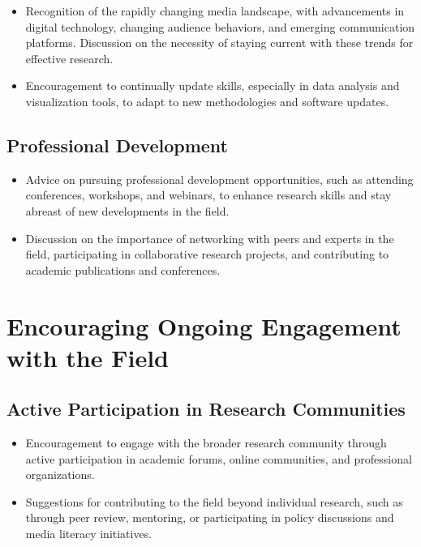\documentclass[
]{book}
\begin{document}
\begin{itemize}
\item
  Recognition of the rapidly changing media landscape, with advancements in digital technology, changing audience behaviors, and emerging communication platforms. Discussion on the necessity of staying current with these trends for effective research.
\item
  Encouragement to continually update skills, especially in data analysis and visualization tools, to adapt to new methodologies and software updates.
\end{itemize}

\hypertarget{professional-development}{%
\subsection*{Professional Development}\label{professional-development}}

\begin{itemize}
\item
  Advice on pursuing professional development opportunities, such as attending conferences, workshops, and webinars, to enhance research skills and stay abreast of new developments in the field.
\item
  Discussion on the importance of networking with peers and experts in the field, participating in collaborative research projects, and contributing to academic publications and conferences.
\end{itemize}

\hypertarget{encouraging-ongoing-engagement-with-the-field}{%
\section*{Encouraging Ongoing Engagement with the Field}\label{encouraging-ongoing-engagement-with-the-field}}

\hypertarget{active-participation-in-research-communities}{%
\subsection*{Active Participation in Research Communities}\label{active-participation-in-research-communities}}

\begin{itemize}
\item
  Encouragement to engage with the broader research community through active participation in academic forums, online communities, and professional organizations.
\item
  Suggestions for contributing to the field beyond individual research, such as through peer review, mentoring, or participating in policy discussions and media literacy initiatives.
\end{itemize}
\end{document}
